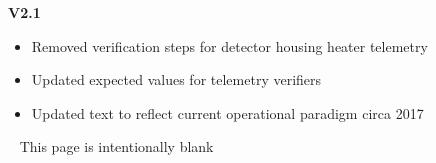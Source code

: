 \documentclass[11pt]{article}
\begin{document}
{\bf V2.1}
\begin{itemize}
\item Removed verification steps for detector housing heater telemetry
\item Updated expected values for telemetry verifiers
\item Updated text to reflect current operational paradigm circa 2017
\end{itemize}

\newpage\
\vspace{0.4\textheight}
\bc This page is intentionally blank \ec

\noindent

\newcommand{\tablecaptiontext}{Put ACIS into Thermal Standby Mode~}

\end{document}
